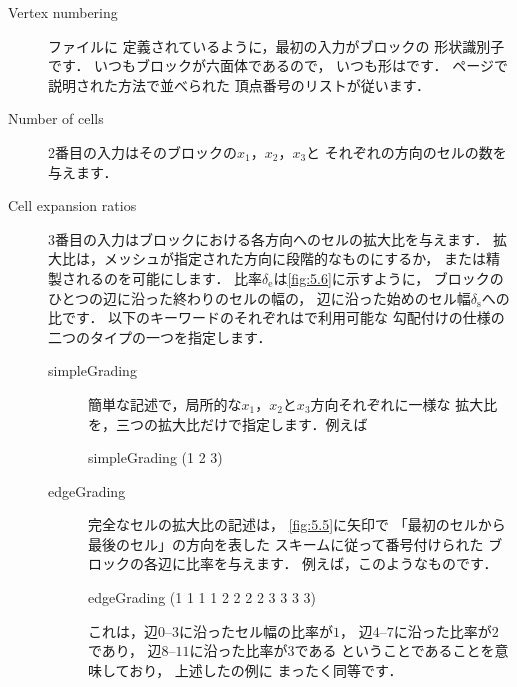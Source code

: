 \begin{description}
 \item[Vertex numbering]
%
            ファイルに
            定義されているように，最初の入力がブロックの
%
            形状識別子です．
            いつもブロックが六面体であるので，
            いつも形はです．
            \pageref{p:U-130}ページで説明された方法で並べられた
            頂点番号のリストが従います．
 \item[Number of cells]
            2番目の入力はそのブロックの$x_{1}$，$x_{2}$，$x_{3}$と
            それぞれの方向のセルの数を与えます．
 \item[Cell expansion ratios]
%
%
            3番目の入力はブロックにおける各方向へのセルの拡大比を与えます．
            拡大比は，メッシュが指定された方向に段階的なものにするか，
            または精製されるのを可能にします．
            比率$\delta_{\mathrm{e}}$は\autoref{fig:5.6}に示すように，
            ブロックのひとつの辺に沿った終わりのセルの幅の，
            辺に沿った始めのセル幅$\delta_{\mathrm{s}}$への比です．
            以下のキーワードのそれぞれはで利用可能な
%
            勾配付けの仕様の二つのタイプの一つを指定します．
            \begin{description}
             \item[simpleGrading]
%
%
                        簡単な記述で，局所的な$x_{1}$，$x_{2}$と$x_{3}$方向それぞれに一様な
                        拡大比を，三つの拡大比だけで指定します．例えば
\begin{OFverbatim}[file]
simpleGrading (1 2 3)
\end{OFverbatim}
             \item[edgeGrading]
%
%
                        完全なセルの拡大比の記述は，
                        \autoref{fig:5.5}に矢印で
                        「最初のセルから最後のセル」の方向を表した
                        スキームに従って番号付けられた
                        ブロックの各辺に比率を与えます．
                        例えば，このようなものです．
\begin{OFverbatim}[file]
edgeGrading (1 1 1 1 2 2 2 2 3 3 3 3)
\end{OFverbatim}
                        これは，辺$0$--$3$に沿ったセル幅の比率が$1$，
                        辺$4$--$7$に沿った比率が$2$であり，
                        辺$8$--$11$に沿った比率が$3$である
                        ということであることを意味しており，
                        上述したの例に
                        まったく同等です．
            \end{description}
\end{description}


